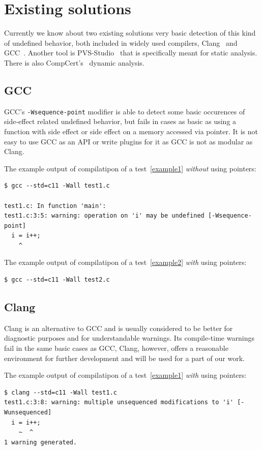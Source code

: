 \section{Existing solutions}
Currently we know about two existing solutions very basic detection of this kind of undefined behavior, both included in widely used compilers, Clang~\cite{Clang} and GCC~\cite{GCC}. Another tool is PVS-Studio~\cite{PVSStudio} that is specifically meant for static analysis. There is also CompCert's~\cite{CompCert} dynamic analysis.
\subsection{GCC}
GCC's \verb|-Wsequence-point| modifier is able to detect some basic occurences of side-effect related undefined behavior, but fails in cases as basic as using a function with side effect or side effect on a memory accessed via pointer. It is not easy to use GCC as an API or write plugins for it as GCC is not as modular as Clang.~\cite{ClangComparison}

The example output of compilatipon of a test~\ref{example1} \emph{without} using pointers:
\begin{lstlisting}
$ gcc --std=c11 -Wall test1.c

test1.c: In function 'main':
test1.c:3:5: warning: operation on 'i' may be undefined [-Wsequence-point]
  i = i++;
    ^
\end{lstlisting}

The example output of compilatipon of a test~\ref{example2} \emph{with} using pointers:
\begin{lstlisting}
$ gcc --std=c11 -Wall test2.c 
\end{lstlisting}
\subsection{Clang}
Clang is an alternative to GCC and is usually considered to be better for diagnostic purposes and for understandable warnings. Its compile-time warnings fail in the same basic cases as GCC, Clang, however, offers a reasonable environment for further development and will be used for a part of our work.

The example output of compilatipon of a test~\ref{example1} \emph{with} using pointers:
\begin{lstlisting}
$ clang --std=c11 -Wall test1.c 
test1.c:3:8: warning: multiple unsequenced modifications to 'i' [-Wunsequenced]
  i = i++;
    ~  ^
1 warning generated.
\end{lstlisting}

